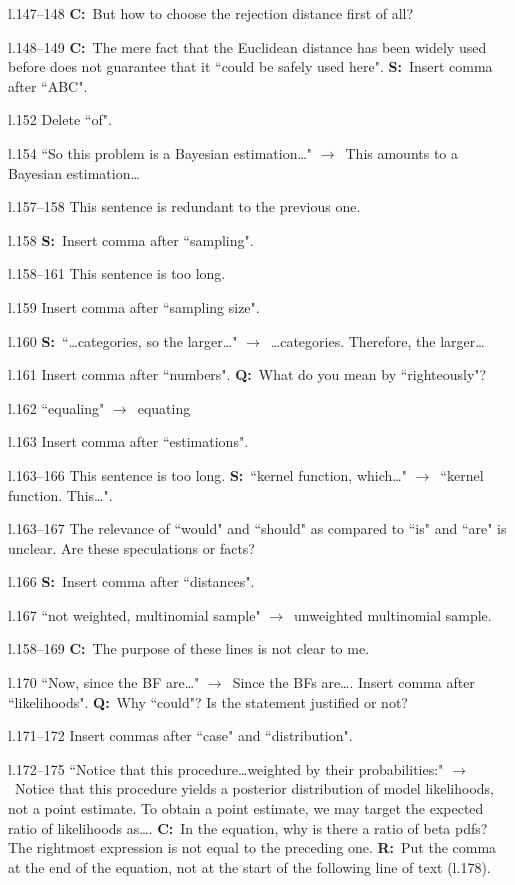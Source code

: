 \documentclass[11pt]{article}
\newenvironment{my_description}
{\begin{description}
  \setlength{\itemsep}{2pt}
  \setlength{\parskip}{0pt}
  \setlength{\parsep}{0pt}}
{\end{description}}
\newcommand{\ra}{$\rightarrow$\ }
\newcommand{\C}{\textbf{C:}\ }
\newcommand{\Q}{\textbf{Q:}\ }
\newcommand{\R}{\textbf{R:}\ }
\newcommand{\V}{\textbf{S:}\ }
\begin{document}
\begin{my_description}
	\item[l.147--148] \C But how to choose the rejection distance first of all?
	\item[l.148--149] \C The mere fact that the Euclidean distance has been widely used before does not guarantee that it ``could be safely used here". \V Insert comma after ``ABC".
	\item[l.152] Delete ``of".
	\item[l.154] ``So this problem is a Bayesian estimation\dots" \ra This amounts to a Bayesian estimation\dots
	\item[l.157--158] This sentence is redundant to the previous one.
	\item[l.158] \V Insert comma after ``sampling".
	\item[l.158--161] This sentence is too long.
	\item[l.159] Insert comma after ``sampling size".
	\item[l.160] \V ``\dots categories, so the larger\dots" \ra \dots categories. Therefore, the larger\dots
	\item[l.161] Insert comma after ``numbers". \Q What do you mean by ``righteously"?
	\item[l.162] ``equaling" \ra equating
	\item[l.163] Insert comma after ``estimations".
	\item[l.163--166] This sentence is too long. \V ``kernel function, which\dots" \ra ``kernel function. This\dots".
	\item[l.163--167] The relevance of ``would" and ``should" as compared to ``is" and ``are" is unclear. Are these speculations or facts?
	\item[l.166] \V Insert comma after ``distances".
	\item[l.167] ``not weighted, multinomial sample" \ra unweighted multinomial sample.
	\item[l.158--169] \C The purpose of these lines is not clear to me.
	\item[l.170] ``Now, since the BF are\dots" \ra Since the BFs are\dots. Insert comma after ``likelihoods". \Q Why ``could"? Is the statement justified or not?
	\item[l.171--172] Insert commas after ``case" and ``distribution".
	\item[l.172--175] ``Notice that this procedure\dots weighted by their probabilities:" \ra Notice that this procedure yields a posterior distribution of model likelihoods, not a point estimate. To obtain a point estimate, we may target the expected ratio of likelihoods as\dots. \C In the equation, why is there a ratio of beta pdfs? The rightmost expression is not equal to the preceding one. \R Put the comma at the end of the equation, not at the start of the following line of text (l.178).

\end{my_description}
\end{document}
